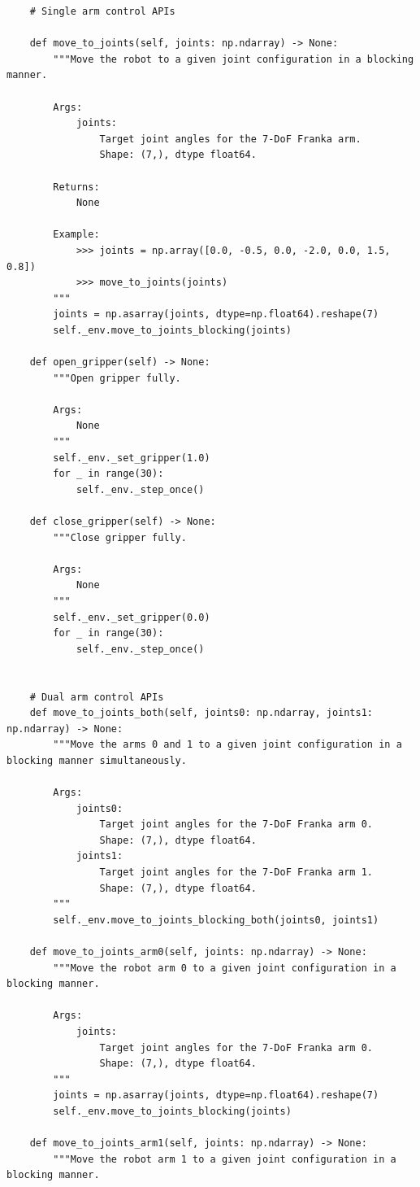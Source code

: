 \begin{lstlisting}
    # Single arm control APIs

    def move_to_joints(self, joints: np.ndarray) -> None:
        """Move the robot to a given joint configuration in a blocking manner.

        Args:
            joints:
                Target joint angles for the 7-DoF Franka arm.
                Shape: (7,), dtype float64.

        Returns:
            None

        Example:
            >>> joints = np.array([0.0, -0.5, 0.0, -2.0, 0.0, 1.5, 0.8])
            >>> move_to_joints(joints)
        """
        joints = np.asarray(joints, dtype=np.float64).reshape(7)
        self._env.move_to_joints_blocking(joints)

    def open_gripper(self) -> None:
        """Open gripper fully.

        Args:
            None
        """
        self._env._set_gripper(1.0)
        for _ in range(30):
            self._env._step_once()

    def close_gripper(self) -> None:
        """Close gripper fully.

        Args:
            None
        """
        self._env._set_gripper(0.0)
        for _ in range(30):
            self._env._step_once()

        
    # Dual arm control APIs
    def move_to_joints_both(self, joints0: np.ndarray, joints1: np.ndarray) -> None:
        """Move the arms 0 and 1 to a given joint configuration in a blocking manner simultaneously.

        Args:
            joints0:
                Target joint angles for the 7-DoF Franka arm 0.
                Shape: (7,), dtype float64.
            joints1:
                Target joint angles for the 7-DoF Franka arm 1.
                Shape: (7,), dtype float64.
        """
        self._env.move_to_joints_blocking_both(joints0, joints1)

    def move_to_joints_arm0(self, joints: np.ndarray) -> None:
        """Move the robot arm 0 to a given joint configuration in a blocking manner.

        Args:
            joints:
                Target joint angles for the 7-DoF Franka arm 0.
                Shape: (7,), dtype float64.
        """
        joints = np.asarray(joints, dtype=np.float64).reshape(7)
        self._env.move_to_joints_blocking(joints)
        
    def move_to_joints_arm1(self, joints: np.ndarray) -> None:
        """Move the robot arm 1 to a given joint configuration in a blocking manner.


\end{lstlisting}
